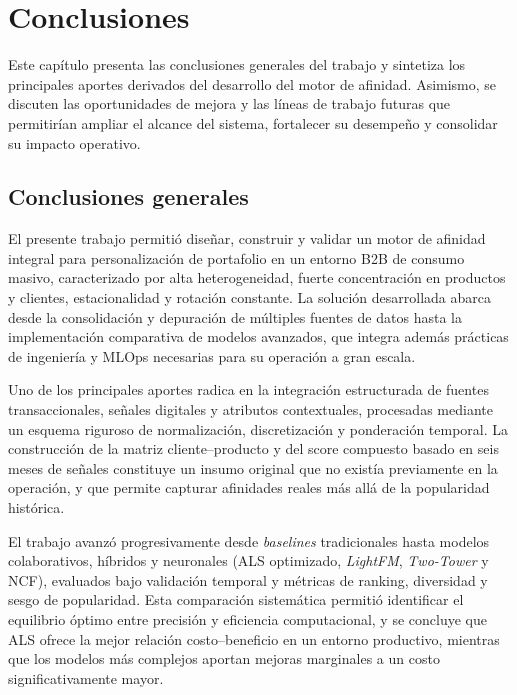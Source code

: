 
\chapter{Conclusiones} %

\label{Chapter5} %
Este capítulo presenta las conclusiones generales del trabajo y sintetiza los principales aportes derivados del desarrollo del motor de afinidad. Asimismo, se discuten las oportunidades de mejora y las líneas de trabajo futuras que permitirían ampliar el alcance del sistema, fortalecer su desempeño y consolidar su impacto operativo.



\section{Conclusiones generales }

El presente trabajo permitió diseñar, construir y validar un motor de afinidad integral para personalización de portafolio en un entorno B2B de consumo masivo, caracterizado por alta heterogeneidad, fuerte concentración en productos y clientes, estacionalidad y rotación constante. La solución desarrollada abarca desde la consolidación y depuración de múltiples fuentes de datos hasta la implementación comparativa de modelos avanzados, que integra además prácticas de ingeniería y MLOps necesarias para su operación a gran escala.

Uno de los principales aportes radica en la integración estructurada de fuentes transaccionales, señales digitales y atributos contextuales, procesadas mediante un esquema riguroso de normalización, discretización y ponderación temporal. La construcción de la matriz cliente–producto y del score compuesto basado en seis meses de señales constituye un insumo original que no existía previamente en la operación, y que permite capturar afinidades reales más allá de la popularidad histórica.

El trabajo avanzó progresivamente desde \textit{baselines} tradicionales hasta modelos colaborativos, híbridos y neuronales (ALS optimizado, \textit{LightFM}, \textit{Two-Tower} y NCF), evaluados bajo validación temporal y métricas de ranking, diversidad y sesgo de popularidad. Esta comparación sistemática permitió identificar el equilibrio óptimo entre precisión y eficiencia computacional, y se concluye que ALS ofrece la mejor relación costo–beneficio en un entorno productivo, mientras que los modelos más complejos aportan mejoras marginales a un costo significativamente mayor.

